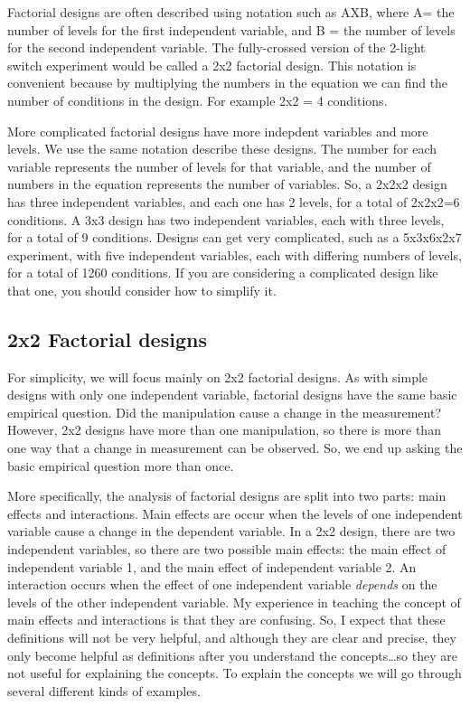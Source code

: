 Factorial designs are often described using notation such as AXB, where
A= the number of levels for the first independent variable, and B = the
number of levels for the second independent variable. The fully-crossed
version of the 2-light switch experiment would be called a 2x2 factorial
design. This notation is convenient because by multiplying the numbers
in the equation we can find the number of conditions in the design. For
example 2x2 = 4 conditions.

More complicated factorial designs have more indepdent variables and
more levels. We use the same notation describe these designs. The number
for each variable represents the number of levels for that variable, and
the number of numbers in the equation represents the number of
variables. So, a 2x2x2 design has three independent variables, and each
one has 2 levels, for a total of 2x2x2=6 conditions. A 3x3 design has
two independent variables, each with three levels, for a total of 9
conditions. Designs can get very complicated, such as a 5x3x6x2x7
experiment, with five independent variables, each with differing numbers
of levels, for a total of 1260 conditions. If you are considering a
complicated design like that one, you should consider how to simplify
it.

\subsection{2x2 Factorial designs}\label{x2-factorial-designs}

For simplicity, we will focus mainly on 2x2 factorial designs. As with
simple designs with only one independent variable, factorial designs
have the same basic empirical question. Did the manipulation cause a
change in the measurement? However, 2x2 designs have more than one
manipulation, so there is more than one way that a change in measurement
can be observed. So, we end up asking the basic empirical question more
than once.

More specifically, the analysis of factorial designs are split into two
parts: main effects and interactions. Main effects are occur when the
levels of one independent variable cause a change in the dependent
variable. In a 2x2 design, there are two independent variables, so there
are two possible main effects: the main effect of independent variable
1, and the main effect of independent variable 2. An interaction occurs
when the effect of one independent variable \emph{depends} on the levels
of the other independent variable. My experience in teaching the concept
of main effects and interactions is that they are confusing. So, I
expect that these definitions will not be very helpful, and although
they are clear and precise, they only become helpful as definitions
after you understand the concepts\ldots{}so they are not useful for
explaining the concepts. To explain the concepts we will go through
several different kinds of examples.

